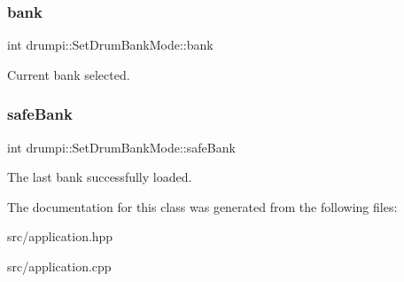 \subsubsection{\texorpdfstring{bank}{bank}}
{\footnotesize\ttfamily int drumpi\+::\+Set\+Drum\+Bank\+Mode\+::bank\hspace{0.3cm}{\ttfamily [private]}}

Current bank selected. \mbox{\label{classdrumpi_1_1SetDrumBankMode_a4cec73d2c5ec1cca126220316f800da1}} 
\subsubsection{\texorpdfstring{safe\+Bank}{safeBank}}
{\footnotesize\ttfamily int drumpi\+::\+Set\+Drum\+Bank\+Mode\+::safe\+Bank\hspace{0.3cm}{\ttfamily [private]}}

The last bank successfully loaded. 

The documentation for this class was generated from the following files\+:\begin{DoxyCompactItemize}
\item 
src/application.\+hpp\item 
src/application.\+cpp\end{DoxyCompactItemize}

